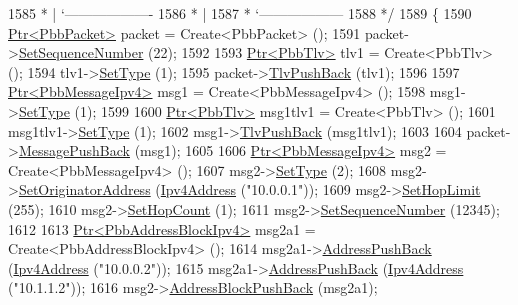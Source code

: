 \begin{DoxyCode}
1585 \textcolor{comment}{         * |    `-------------------}
1586 \textcolor{comment}{         * |}
1587 \textcolor{comment}{         * `------------------}
1588 \textcolor{comment}{   */}
1589   \{
1590     \hyperlink{classns3_1_1Ptr}{Ptr<PbbPacket>} packet = Create<PbbPacket> ();
1591     packet->\hyperlink{classns3_1_1PbbPacket_a7d6a1602be86109760d0f26ff9bbbb8e}{SetSequenceNumber} (22);
1592 
1593     \hyperlink{classns3_1_1Ptr}{Ptr<PbbTlv>} tlv1 = Create<PbbTlv> ();
1594     tlv1->\hyperlink{classns3_1_1PbbTlv_a90a0452018ed364ac37c3ad116dd718b}{SetType} (1);
1595     packet->\hyperlink{classns3_1_1PbbPacket_a34935793e729a106c176db99c969cb42}{TlvPushBack} (tlv1);
1596 
1597     \hyperlink{classns3_1_1Ptr}{Ptr<PbbMessageIpv4>} msg1 = Create<PbbMessageIpv4> ();
1598     msg1->\hyperlink{classns3_1_1PbbMessage_a4b3d1eaabd3e7412a46ac79bf3360dac}{SetType} (1);
1599 
1600     \hyperlink{classns3_1_1Ptr}{Ptr<PbbTlv>} msg1tlv1 = Create<PbbTlv> ();
1601     msg1tlv1->\hyperlink{classns3_1_1PbbTlv_a90a0452018ed364ac37c3ad116dd718b}{SetType} (1);
1602     msg1->\hyperlink{classns3_1_1PbbMessage_aac70b2672f79765cf5cc5b6666018165}{TlvPushBack} (msg1tlv1);
1603 
1604     packet->\hyperlink{classns3_1_1PbbPacket_a4a3170001ef758d9c9c4375b8f089826}{MessagePushBack} (msg1);
1605 
1606     \hyperlink{classns3_1_1Ptr}{Ptr<PbbMessageIpv4>} msg2 = Create<PbbMessageIpv4> ();
1607     msg2->\hyperlink{classns3_1_1PbbMessage_a4b3d1eaabd3e7412a46ac79bf3360dac}{SetType} (2);
1608     msg2->\hyperlink{classns3_1_1PbbMessage_a52ac135a2bec53db5e8f46b8b8a25e7c}{SetOriginatorAddress} (\hyperlink{classns3_1_1Ipv4Address}{Ipv4Address} (\textcolor{stringliteral}{"10.0.0.1"}));
1609     msg2->\hyperlink{classns3_1_1PbbMessage_a532a7e5e135f7491f8a84ab1dfadd28f}{SetHopLimit} (255);
1610     msg2->\hyperlink{classns3_1_1PbbMessage_a882ec7e2e9a9dff6297152c196d54ce4}{SetHopCount} (1);
1611     msg2->\hyperlink{classns3_1_1PbbMessage_a8c24696ac67507afa03c9750daccc47d}{SetSequenceNumber} (12345);
1612 
1613     \hyperlink{classns3_1_1Ptr}{Ptr<PbbAddressBlockIpv4>} msg2a1 = Create<PbbAddressBlockIpv4> ();
1614     msg2a1->\hyperlink{classns3_1_1PbbAddressBlock_a7be545a53d69bd426dbebcf752ed8371}{AddressPushBack} (\hyperlink{classns3_1_1Ipv4Address}{Ipv4Address} (\textcolor{stringliteral}{"10.0.0.2"}));
1615     msg2a1->\hyperlink{classns3_1_1PbbAddressBlock_a7be545a53d69bd426dbebcf752ed8371}{AddressPushBack} (\hyperlink{classns3_1_1Ipv4Address}{Ipv4Address} (\textcolor{stringliteral}{"10.1.1.2"}));
1616     msg2->\hyperlink{classns3_1_1PbbMessage_a5f623bad2fb1adde7da885e1c92d5311}{AddressBlockPushBack} (msg2a1);

\end{DoxyCode}
